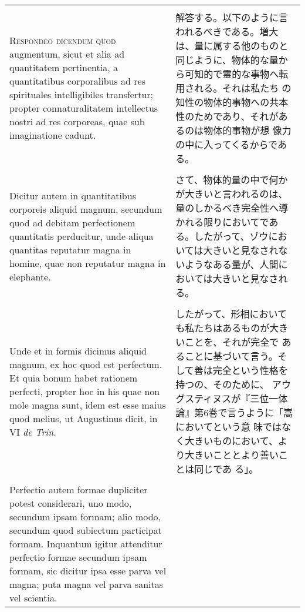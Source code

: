 \documentclass[10pt]{jsarticle} %
\begin{document}
\begin{longtable}{p{21em}p{21em}}
\\\\


{\scshape Respondeo dicendum quod} augmentum, sicut et alia ad quantitatem
pertinentia, a quantitatibus corporalibus ad res spirituales
intelligibiles transfertur; propter connaturalitatem intellectus
nostri ad res corporeas, quae sub imaginatione cadunt. 
&

解答する。以下のように言われるべきである。増大は、量に属する他のものと
同じように、物体的な量から可知的で霊的な事物へ転用される。それは私たち
の知性の物体的事物への共本性のためであり、それがあるのは物体的事物が想
像力の中に入ってくるからである。

\\\\


Dicitur autem
in quantitatibus corporeis aliquid magnum, secundum quod ad debitam
perfectionem quantitatis perducitur, unde aliqua quantitas reputatur
magna in homine, quae non reputatur magna in elephante. 

&

さて、物体的量の中で何かが大きいと言われるのは、量のしかるべき完全性へ導かれる限りにおいてである。したがって、ゾウにおいては大きいと見なされないようなある量が、人間においては大きいと見なされる。

\\\\


Unde et in
formis dicimus aliquid magnum, ex hoc quod est perfectum. Et quia
bonum habet rationem perfecti, propter hoc in his quae non mole magna
sunt, idem est esse maius quod melius, ut Augustinus dicit, in VI {\itshape de
Trin}. 


&

したがって、形相においても私たちはあるものが大きいことを、それが完全で
あることに基づいて言う。そして善は完全という性格を持つの、そのために、
アウグスティヌスが『三位一体論』第6巻で言うように「嵩においてという意
味ではなく大きいものにおいて、より大きいこととより善いことは同じであ
る」。

\\\\

Perfectio autem formae dupliciter potest considerari, uno modo,
secundum ipsam formam; alio modo, secundum quod subiectum participat
formam. 
Inquantum igitur attenditur perfectio formae secundum ipsam
formam, sic dicitur ipsa esse parva vel magna; puta magna vel parva
sanitas vel scientia. 



\end{longtable}
\end{document}
